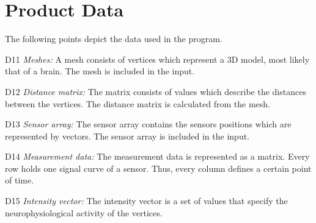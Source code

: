 \section{Product Data}
The following points depict the data used in the program.
	\begin{aims}
		\item[D11] \textit{Meshes:} A mesh consists of vertices which represent a 3D model, most likely that of a brain. The mesh is included in the input.
		
		\item[D12] \textit{Distance matrix:} The matrix consists of values which describe the distances between the vertices. The distance matrix is calculated from the mesh.
		
		\item[D13] \textit{Sensor array:} The sensor array contains the sensors positions which are represented by vectors. The sensor array is included in the input.
		
		\item[D14] \textit{Measurement data:} The measurement data is represented as a matrix. Every row holds one signal curve of a sensor. Thus, every column defines a certain point of time.
		
		\item[D15] \textit{Intensity vector:} The intensity vector is a set of values that specify the neurophysiological activity of the vertices.
	\end{aims}